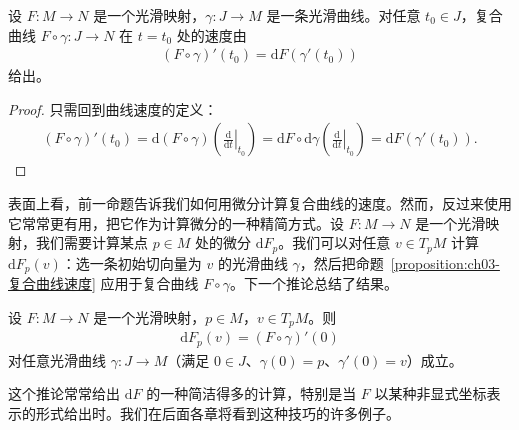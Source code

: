 \documentclass[../../main.tex]{subfiles}
\begin{document}
\begin{proposition}[复合曲线的速度]\label{proposition:ch03-复合曲线速度}
设 $F:M\to N$ 是一个光滑映射，$\gamma:J\to M$ 是一条光滑曲线。对任意 $t_{0}\in J$，复合曲线 $F\circ\gamma:J\to N$ 在 $t=t_{0}$ 处的速度由
\begin{align*}
(F\circ\gamma)'(t_{0})=\mathrm{d}F(\gamma'(t_{0}))
\end{align*}
给出。
\end{proposition}

\begin{proof}
只需回到曲线速度的定义：
\begin{align*}
(F\circ\gamma)'(t_{0})=\mathrm{d}(F\circ\gamma)\left(\left.\frac{\mathrm{d}}{\mathrm{d}t}\right|_{t_{0}}\right)
=\mathrm{d}F\circ\mathrm{d}\gamma\left(\left.\frac{\mathrm{d}}{\mathrm{d}t}\right|_{t_{0}}\right)
=\mathrm{d}F(\gamma'(t_{0})).
\end{align*}
\end{proof}

表面上看，前一命题告诉我们如何用微分计算复合曲线的速度。然而，反过来使用它常常更有用，把它作为计算微分的一种精简方式。设 $F:M\to N$ 是一个光滑映射，我们需要计算某点 $p\in M$ 处的微分 $\mathrm{d}F_{p}$。我们可以对任意 $v\in T_{p}M$ 计算 $\mathrm{d}F_{p}(v)$：选一条初始切向量为 $v$ 的光滑曲线 $\gamma$，然后把命题~\cref{proposition:ch03-复合曲线速度} 应用于复合曲线 $F\circ\gamma$。下一个推论总结了结果。

\begin{corollary}[用速度向量计算微分]\label{corollary:ch03-用速度算微分}
设 $F:M\to N$ 是一个光滑映射，$p\in M$，$v\in T_{p}M$。则
\begin{align*}
\mathrm{d}F_{p}(v)=(F\circ\gamma)'(0)
\end{align*}
对任意光滑曲线 $\gamma:J\to M$（满足 $0\in J$、$\gamma(0)=p$、$\gamma'(0)=v$）成立。
\end{corollary}

这个推论常常给出 $\mathrm{d}F$ 的一种简洁得多的计算，特别是当 $F$ 以某种非显式坐标表示的形式给出时。我们在后面各章将看到这种技巧的许多例子。
\end{document}

